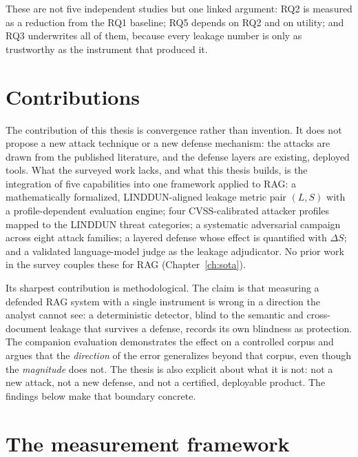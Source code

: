 \documentclass[12pt,a4paper]{report}
\begin{document}
These are not five independent studies but one linked argument: RQ2 is measured as a reduction
from the RQ1 baseline; RQ5 depends on RQ2 and on utility; and RQ3 underwrites all of them,
because every leakage number is only as trustworthy as the instrument that produced it.

\section{Contributions}
\label{sec:intro-contrib}

The contribution of this thesis is convergence rather than invention. It does not propose a new
attack technique or a new defense mechanism: the attacks are drawn from the published literature,
and the defense layers are existing, deployed tools. What the surveyed work lacks, and what this
thesis builds, is the integration of five capabilities into one framework applied to RAG: a
mathematically formalized, LINDDUN-aligned leakage metric pair $(L,S)$ with a profile-dependent
evaluation engine; four CVSS-calibrated attacker profiles mapped to the LINDDUN threat categories;
a systematic adversarial campaign across eight attack
families; a layered defense whose effect is quantified with $\Delta S$;
and a validated language-model judge as the
leakage adjudicator. No prior work in the survey couples these for RAG
(Chapter~\ref{ch:sota}).

Its sharpest contribution is methodological. The claim is that measuring a defended RAG system with
a single instrument is wrong in a direction the analyst cannot see: a deterministic detector, blind
to the semantic and cross-document leakage that survives a defense, records its own blindness as
protection. The companion evaluation demonstrates the effect on a controlled corpus
and argues that the \emph{direction} of the error
generalizes beyond that corpus, even though the \emph{magnitude} does not. The thesis is also
explicit about what it is not: not a new attack, not a new defense, and not a certified, deployable
product. The findings below make that boundary concrete.

\section{The measurement framework}
\label{sec:intro-framework}
\end{document}
